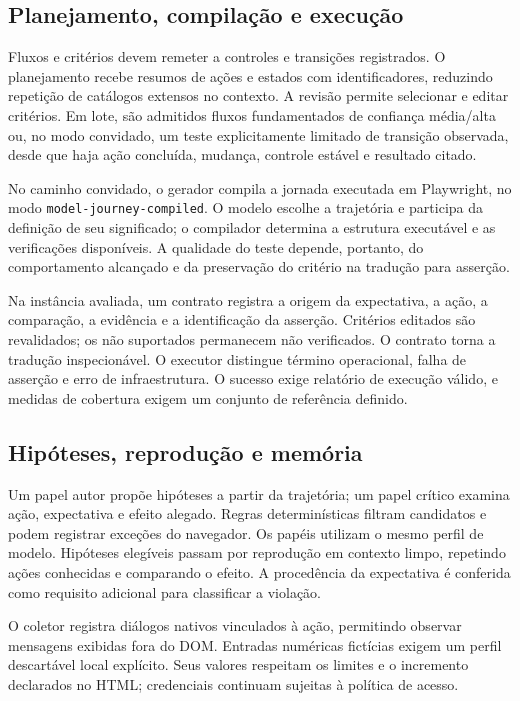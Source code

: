 \documentclass[12pt]{article}
\begin{document}
\subsection{Planejamento, compilação e execução}
Fluxos e critérios devem remeter a controles e transições registrados. O planejamento recebe resumos de ações e estados com identificadores, reduzindo repetição de catálogos extensos no contexto. A revisão permite selecionar e editar critérios. Em lote, são admitidos fluxos fundamentados de confiança média/alta ou, no modo convidado, um teste explicitamente limitado de transição observada, desde que haja ação concluída, mudança, controle estável e resultado citado.

No caminho convidado, o gerador compila a jornada executada em Playwright, no modo \texttt{model-journey-compiled}. O modelo escolhe a trajetória e participa da definição de seu significado; o compilador determina a estrutura executável e as verificações disponíveis. A qualidade do teste depende, portanto, do comportamento alcançado e da preservação do critério na tradução para asserção.

Na instância avaliada, um contrato registra a origem da expectativa, a ação, a comparação, a evidência e a identificação da asserção. Critérios editados são revalidados; os não suportados permanecem não verificados. O contrato torna a tradução inspecionável. O executor distingue término operacional, falha de asserção e erro de infraestrutura. O sucesso exige relatório de execução válido, e medidas de cobertura exigem um conjunto de referência definido.

\subsection{Hipóteses, reprodução e memória}
Um papel autor propõe hipóteses a partir da trajetória; um papel crítico examina ação, expectativa e efeito alegado. Regras determinísticas filtram candidatos e podem registrar exceções do navegador. Os papéis utilizam o mesmo perfil de modelo. Hipóteses elegíveis passam por reprodução em contexto limpo, repetindo ações conhecidas e comparando o efeito. A procedência da expectativa é conferida como requisito adicional para classificar a violação.

O coletor registra diálogos nativos vinculados à ação, permitindo observar mensagens exibidas fora do DOM. Entradas numéricas fictícias exigem um perfil descartável local explícito. Seus valores respeitam os limites e o incremento declarados no HTML; credenciais continuam sujeitas à política de acesso.
\end{document}
